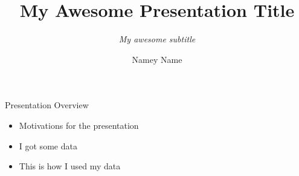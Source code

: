 \documentclass[10pt]{beamer}
\title{My Awesome Presentation Title}
\subtitle{\normalsize \textit{My awesome subtitle}}
\date{}
\author{Namey Name}
\institute{University of Washington, Department of Awesome}
\begin{document}
\maketitle

\begin{frame}{Presentation Overview}
  \begin{itemize}
    \item Motivations for the presentation
    \item I got some data
    \item This is how I used my data
  \end{itemize}
\end{frame}
\end{document}

